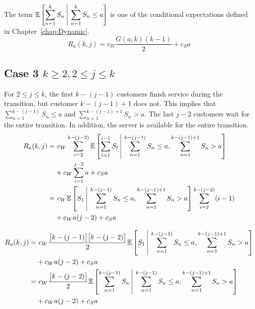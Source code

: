 The term $\displaystyle \mathbb{E} \left[ \sum_{n = 1}^{k} S_{n} \ \vline \ \sum_{n = 1}^{k} S_{n} \leq a \right]$ is one of the conditional expectations defined in Chapter~\ref{chap:Dynamic}.
\begin{equation}
	R_{a} (k, j) = c_{W} \frac{G (a; k) (k - 1)}{2} + c_{S} a
\end{equation}

\subsection{Case 3 $k \geq 2, 2 \leq j \leq k$}
For $2 \leq j \leq k$, the first $k - (j - 1)$ customers finish service during the transition, but customer $k - (j - 1) + 1$ does not. This implies that $\displaystyle \sum_{n = 1}^{k - (j - 1)} S_{n} \leq a$ and $\displaystyle \sum_{n = 1}^{k - (j - 1) + 1} S_{n} > a$. The last $j - 2$ customers wait for the entire transition. In addition, the server is available for the entire transition.
\begin{align*}
	R_{a} (k, j)
	= & \ c_{W} \sum_{i = 2}^{k - (j - 2)} \mathbb{E} \left[ \sum_{l = 1}^{i - 1} S_{l} \ \vline \ \sum_{n = 1}^{k - (j - 1)} S_{n} \leq a, \sum_{n = 1}^{k - (j - 1) + 1} S_{n} > a \right] \\
	& + c_{W} \sum_{i = 1}^{j - 2} a + c_{S} a \\
	= & \ c_{W} \mathbb{E} \left[ S_{1} \ \vline \ \sum_{n = 1}^{k - (j - 1)} S_{n} \leq a, \sum_{n = 1}^{k - (j - 1) + 1} S_{n} > a \right] \sum_{i = 2}^{k - (j - 2)} (i - 1) \\
	& + c_{W} a (j - 2) + c_{S} a \\
\end{align*}

\begin{equation}
	\begin{split}
		R_{a} (k, j)
		= & \ c_{W} \frac{ \big[ k - (j - 1) \big] \big[ k - (j - 2) \big]}{2} \mathbb{E} \left[ S_{1} \ \vline \ \sum_{n = 1}^{k - (j - 1)} S_{n} \leq a, \sum_{n = 1}^{k - (j - 1) + 1} S_{n} > a \right] \\
		& + c_{W} a (j - 2) + c_{S} a \\
		= & \ c_{W} \frac{ \big[ k - (j - 2) \big]}{2} \mathbb{E} \left[ \sum_{n = 1}^{k - (j - 1)} S_{n} \ \vline \ \sum_{n = 1}^{k - (j - 1)} S_{n} \leq a, \sum_{n = 1}^{k - (j - 1) + 1} S_{n} > a \right] \\
		& + c_{W} a (j - 2) + c_{S} a \\
	\end{split}
\end{equation}


